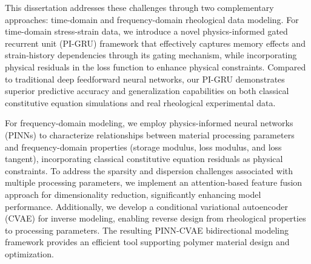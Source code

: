 This dissertation addresses these challenges through two complementary approaches: time-domain and frequency-domain rheological data modeling. For time-domain stress-strain data, we introduce a novel physics-informed gated recurrent unit (PI-GRU) framework that effectively captures memory effects and strain-history dependencies through its gating mechanism, while incorporating physical residuals in the loss function to enhance physical constraints. Compared to traditional deep feedforward neural networks, our PI-GRU demonstrates superior predictive accuracy and generalization capabilities on both classical constitutive equation simulations and real rheological experimental data.

For frequency-domain modeling, we employ physics-informed neural networks (PINNs) to characterize relationships between material processing parameters and frequency-domain properties (storage modulus, loss modulus, and loss tangent), incorporating classical constitutive equation residuals as physical constraints. To address the sparsity and dispersion challenges associated with multiple processing parameters, we implement an attention-based feature fusion approach for dimensionality reduction, significantly enhancing model performance. Additionally, we develop a conditional variational autoencoder (CVAE) for inverse modeling, enabling reverse design from rheological properties to processing parameters. The resulting PINN-CVAE bidirectional modeling framework provides an efficient tool supporting polymer material design and optimization.
